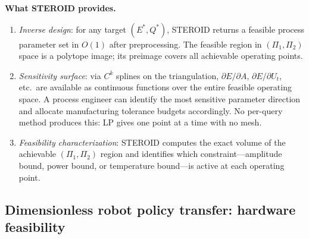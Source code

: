 \documentclass[review,onefignum,onetabnum]{./SIAM_template/siamart171218}
\begin{document}
\textbf{What STEROID provides.}
\begin{enumerate}
	\item \emph{Inverse design}: for any target $(E^*, Q^*)$, STEROID returns a
	      feasible process parameter set in $O(1)$ after preprocessing.  The feasible
	      region in $(\Pi_1, \Pi_2)$ space is a polytope image; its preimage covers all
	      achievable operating points.
	\item \emph{Sensitivity surface}: via $C^k$ splines on the triangulation,
	      $\partial E / \partial A$, $\partial E / \partial U_t$, etc.\ are available
	      as continuous functions over the entire feasible operating space.  A process
	      engineer can identify the most sensitive parameter direction and allocate
	      manufacturing tolerance budgets accordingly.  No per-query method produces
	      this: LP gives one point at a time with no mesh.
	\item \emph{Feasibility characterization}: STEROID computes the exact volume of the
	      achievable $(\Pi_1, \Pi_2)$ region and identifies which constraint---amplitude
	      bound, power bound, or temperature bound---is active at each operating point.
\end{enumerate}


\subsection{Dimensionless robot policy transfer: hardware feasibility}
\label{sec:robot}
\end{document}
